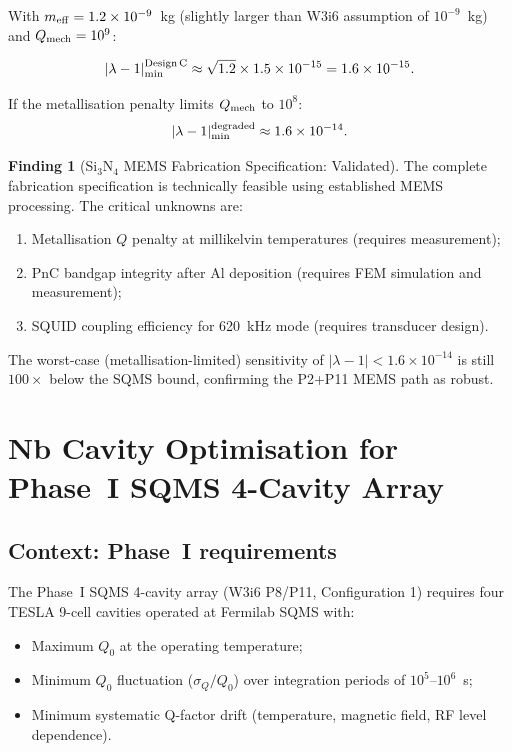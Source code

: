 \documentclass[11pt]{article}
\theoremstyle{definition}
\newtheorem{finding}[theorem]{Finding}
\theoremstyle{remark}
\newcommand{\ee}[1]{\times 10^{#1}}
\newcommand{\lam}{|\lambda-1|}
\newcommand{\Qmech}{Q_{\rm mech}}
\begin{document}
With $m_{\rm eff} = 1.2\ee{-9}$~kg (slightly larger than W3i6
assumption of $10^{-9}$~kg) and $\Qmech = 10^9$:

\begin{equation}
  \lam_{\rm min}^{\rm Design\,C} \approx \sqrt{1.2}\times 1.5\ee{-15}
  = 1.6\ee{-15}.
\end{equation}

If the metallisation penalty limits $\Qmech$ to $10^8$:
\begin{equation}
  \lam_{\rm min}^{\rm degraded} \approx 1.6\ee{-14}.
\end{equation}

\begin{finding}[Si$_3$N$_4$ MEMS Fabrication Specification: Validated]
\label{find:si3n4_spec}
The complete fabrication specification is technically feasible using
established MEMS processing. The critical unknowns are:
\begin{enumerate}[nosep]
  \item Metallisation $Q$ penalty at millikelvin temperatures
    (requires measurement);
  \item PnC bandgap integrity after Al deposition (requires FEM
    simulation and measurement);
  \item SQUID coupling efficiency for 620~kHz mode (requires
    transducer design).
\end{enumerate}
The worst-case (metallisation-limited) sensitivity of
$\lam < 1.6\ee{-14}$ is still $100\times$ below the SQMS bound,
confirming the P2+P11 MEMS path as robust.
\end{finding}


\section{Nb Cavity Optimisation for Phase~I SQMS 4-Cavity Array}
\label{sec:nb_optimisation}

\subsection{Context: Phase~I requirements}

The Phase~I SQMS 4-cavity array (W3i6 P8/P11, Configuration 1) requires
four TESLA 9-cell cavities operated at Fermilab SQMS with:
\begin{itemize}[nosep]
  \item Maximum $Q_0$ at the operating temperature;
  \item Minimum $Q_0$ fluctuation ($\sigma_Q/Q_0$) over integration
    periods of $10^5$--$10^6$~s;
  \item Minimum systematic Q-factor drift (temperature, magnetic field,
    RF level dependence).
\end{itemize}
\end{document}
